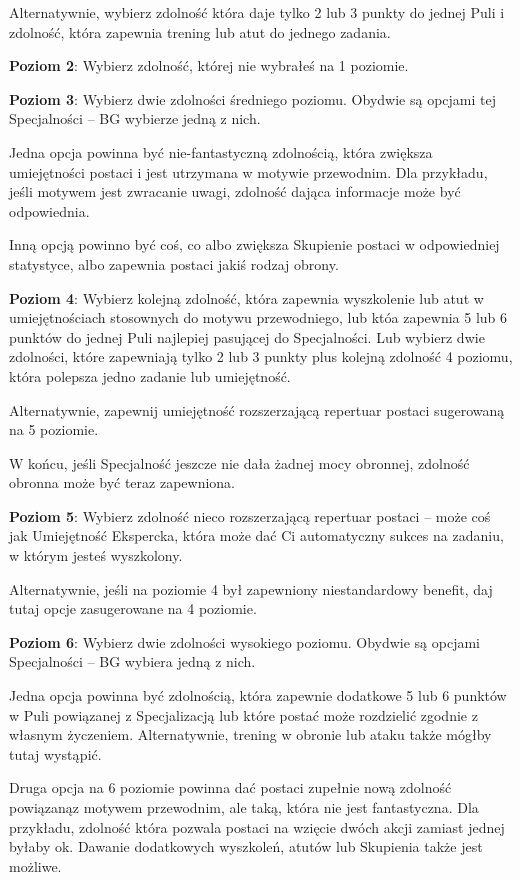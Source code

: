 Alternatywnie, wybierz zdolność która daje tylko 2 lub 3 punkty do jednej Puli i zdolność, która zapewnia trening lub atut do jednego zadania.

\textbf{Poziom 2}: Wybierz zdolność, której nie wybrałeś na 1 poziomie.

\textbf{Poziom 3}: Wybierz dwie zdolności średniego poziomu. Obydwie są opcjami tej Specjalności – BG wybierze jedną z nich.

Jedna opcja powinna być nie-fantastyczną zdolnością, która zwiększa umiejętności postaci i jest utrzymana w motywie przewodnim. Dla przykładu, jeśli motywem jest zwracanie uwagi, zdolność dająca informacje może być odpowiednia.

Inną opcją powinno być coś, co albo zwiększa Skupienie postaci w odpowiedniej statystyce, albo zapewnia postaci jakiś rodzaj obrony.

\textbf{Poziom 4}: Wybierz kolejną zdolność, która zapewnia wyszkolenie lub atut w umiejętnościach stosownych do motywu przewodniego, lub któa zapewnia 5 lub 6 punktów do jednej Puli najlepiej pasującej do Specjalności. Lub wybierz dwie zdolności, które zapewniają tylko 2 lub 3 punkty plus kolejną zdolność 4 poziomu, która polepsza jedno zadanie lub umiejętność. 

Alternatywnie, zapewnij umiejętność rozszerzającą repertuar postaci sugerowaną na 5 poziomie.

W końcu, jeśli Specjalność jeszcze nie dała żadnej mocy obronnej, zdolność obronna może być teraz zapewniona.

\textbf{Poziom 5}: Wybierz zdolność nieco rozszerzającą repertuar postaci – może coś jak Umiejętność Ekspercka, która może dać Ci automatyczny sukces na zadaniu, w którym jesteś wyszkolony.

Alternatywnie, jeśli na poziomie 4 był zapewniony niestandardowy benefit, daj tutaj opcje zasugerowane na 4 poziomie.

\textbf{Poziom 6}: Wybierz dwie zdolności wysokiego poziomu. Obydwie są opcjami Specjalności – BG wybiera jedną z nich.

Jedna opcja powinna być zdolnością, która zapewnie dodatkowe 5 lub 6 punktów w Puli powiązanej z Specjalizacją lub które postać może rozdzielić zgodnie z własnym życzeniem. Alternatywnie, trening w obronie lub ataku także mógłby tutaj wystąpić.

Druga opcja na 6 poziomie powinna dać postaci zupełnie nową zdolność powiązanąz motywem przewodnim, ale taką, która nie jest fantastyczna. Dla przykładu, zdolność która pozwala postaci na wzięcie dwóch akcji zamiast jednej byłaby ok. Dawanie dodatkowych wyszkoleń, atutów lub Skupienia także jest możliwe.

